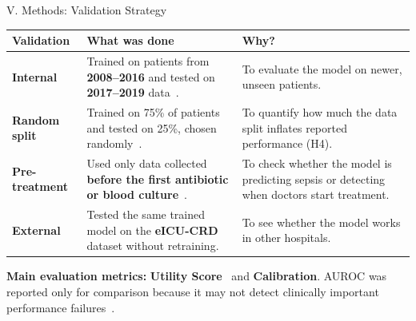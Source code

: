 \begin{frame}{V. Methods: Validation Strategy}
\tablestyle
\begin{center}
\begin{tabular}{p{2cm}p{6cm}p{4.5cm}}
\toprule
\textbf{Validation} & \textbf{What was done} & \textbf{Why?} \\
\midrule
\textbf{Internal}
  & Trained on patients from \textbf{2008--2016} and tested on
    \textbf{2017--2019} data~\cite{guo2022temporal}.
  & To evaluate the model on newer, unseen patients. \\[3pt]
\textbf{Random split}
  & Trained on 75\% of patients and tested on 25\%, chosen
    randomly~\cite{guo2022temporal}.
  & To quantify how much the data split inflates reported
    performance (H4). \\[3pt]
\textbf{Pre-treatment}
  & Used only data collected \textbf{before the first antibiotic or blood
    culture}~\cite{kamran2024evaluation}.
  & To check whether the model is predicting sepsis or detecting when
    doctors start treatment. \\[3pt]
\textbf{External}
  & Tested the same trained model on the
    \textbf{eICU-CRD}~\cite{pollard2018eicu} dataset without retraining.
  & To see whether the model works in other hospitals. \\
\bottomrule
\end{tabular}
\end{center}

\vspace{4pt}
\textbf{Main evaluation metrics:} \textbf{Utility
Score}~\cite{reyna2020utility} and \textbf{Calibration}. AUROC was reported
only for comparison because it may not detect clinically important
performance failures~\cite{wang2025srpm}.
\end{frame}


